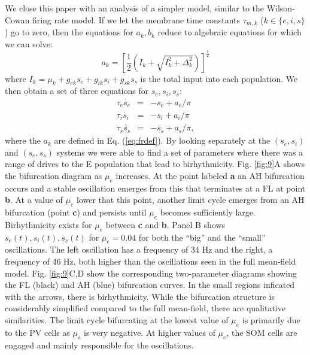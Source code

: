 \documentclass[10pt,letterpaper]{article}
\begin{document}
We close this paper with an analysis of a simpler model, similar to the Wilson-Cowan firing rate model.  If we let the membrane time constants $\tau_{m,k}$ ($k\in\{e,i,s\}$) go to zero, then the equations for $a_k,b_k$ reduce to algebraic equations for which we can solve:
\begin{equation}
  \label{eq:frdef}
a_k = \left[\frac{1}{2}\left(I_k+\sqrt{I_k^2+\Delta_k^2}\right)\right]^\frac{1}{2}
\end{equation}
where $I_k=\mu_k+g_{ek}s_e+g_{ik}s_i+g_{sk}s_s$ is the total input into each population.  We then obtain a set of three equations for $s_e,s_i,s_s$:
\begin{eqnarray}
  \tau_{e} \dot{s_e} &=& -s_e+a_e/\pi \nonumber \\
  \label{eq:fr}
  \tau_{i} \dot{s_i} &=& -s_i+a_i/\pi \\
  \tau_{s} \dot{s_s} &=& -s_s+a_s/\pi, \nonumber
\end{eqnarray}
where the $a_k$ are defined in Eq. (\ref{eq:frdef}).   By looking separately at the $(s_e,s_i)$ and $(s_e,s_s)$ systems we were able to find a set of parameters where there was a range of drives to the E population that lead to birhythmicity.  Fig. \ref{fig:9}A shows the bifurcation diagram as $\mu_e$ increases.  At the point labeled {\bf a} an AH bifurcation occurs and a stable oscillation emerges from this that terminates at a FL at point {\bf b}. At a value of $\mu_e$ lower that this point, another limit cycle emerges from an AH bifurcation (point {\bf c}) and persists until $\mu_e$ becomes sufficiently large.  Birhythmicity exists for $\mu_e$ between {\bf c} and {\bf b}.  Panel B shows $s_e(t),s_i(t),s_s(t)$ for $\mu_e=0.04$  for both the ``big'' and the ``small'' oscillations. The left oscillation has a frequency of 34 Hz and the  
right, a frequency of 46 Hz, both higher than the oscillations seen in the full mean-field model.  Fig. \ref{fig:9}C,D show the corresponding two-parameter diagrams showing the FL (black) and AH (blue) bifurcation curves. In the small regions inficated with the arrows, there is birhythmicity.  While the bifurcation structure is considerably simplified compared to the full mean-field, there are qualitative similarities. The limit cycle bifurcating at the lowest value of $\mu_e$ is primarily due to the PV cells as $\mu_s$ is very negative. At higher values of $\mu_e$, the SOM cells are engaged and mainly responsible for the oscillations.   
\end{document}
